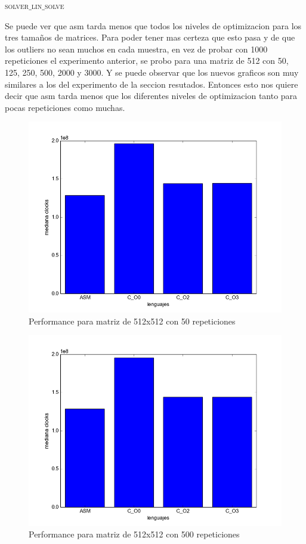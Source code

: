 {\scshape\Large solver$\_$lin$\_$solve\par}

Se puede ver que asm tarda menos que todos los niveles de optimizacion para los tres tamaños de matrices. Para poder tener mas certeza que esto pasa y de que los outliers no sean muchos en cada muestra, en vez de probar con 1000 repeticiones el experimento anterior, se probo para una matriz de 512 con 50, 125, 250, 500, 2000 y 3000. Y se puede observar que los nuevos graficos son muy similares a los del experimento de la seccion resutados. Entonces esto nos quiere decir que asm tarda menos que los diferentes niveles de optimizacion tanto para pocas repeticiones como muchas. 

\begin{figure}[h]
  \centering
    \includegraphics[width=.6\linewidth]{Matriz_512_50.png}
    \caption{Performance para matriz de 512x512 con 50 repeticiones}
    \label{fig:M50it}
\end{figure}

\begin{figure}[h]
  \centering
    \includegraphics[width=.6\linewidth]{Matriz_512_500.png}
    \caption{Performance para matriz de 512x512 con 500 repeticiones}
    \label{fig:M500it}
\end{figure}

